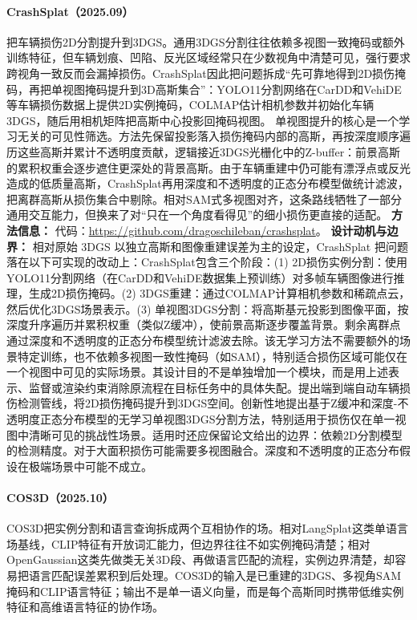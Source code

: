 \paragraph{CrashSplat（2025.09）\cite{2509_23947}}
把车辆损伤2D分割提升到3DGS。通用3DGS分割往往依赖多视图一致掩码或额外训练特征，但车辆划痕、凹陷、反光区域经常只在少数视角中清楚可见，强行要求跨视角一致反而会漏掉损伤。CrashSplat因此把问题拆成“先可靠地得到2D损伤掩码，再把单视图掩码提升到3D高斯集合”：YOLO11分割网络在CarDD和VehiDE等车辆损伤数据上提供2D实例掩码，COLMAP估计相机参数并初始化车辆3DGS，随后用相机矩阵把高斯中心投影回掩码视图。
单视图提升的核心是一个学习无关的可见性筛选。方法先保留投影落入损伤掩码内部的高斯，再按深度顺序遍历这些高斯并累计不透明度贡献，逻辑接近3DGS光栅化中的Z-buffer：前景高斯的累积权重会逐步遮住更深处的背景高斯。由于车辆重建中仍可能有漂浮点或反光造成的低质量高斯，CrashSplat再用深度和不透明度的正态分布模型做统计滤波，把离群高斯从损伤集合中剔除。相对SAM式多视图对齐，这条路线牺牲了一部分通用交互能力，但换来了对“只在一个角度看得见”的细小损伤更直接的适配。
\textbf{方法信息：} 代码：\url{https://github.com/dragoschileban/crashsplat}。
\textbf{设计动机与边界：} 相对原始 3DGS 以独立高斯和图像重建误差为主的设定，CrashSplat 把问题落在以下可实现的改动上：CrashSplat包含三个阶段：(1) 2D损伤实例分割：使用YOLO11分割网络（在CarDD和VehiDE数据集上预训练）对多帧车辆图像进行推理，生成2D损伤掩码。(2) 3DGS重建：通过COLMAP计算相机参数和稀疏点云，然后优化3DGS场景表示。(3) 单视图3DGS分割：将高斯基元投影到图像平面，按深度升序遍历并累积权重（类似Z缓冲），使前景高斯逐步覆盖背景。剩余离群点通过深度和不透明度的正态分布模型统计滤波去除。该无学习方法不需要额外的场景特定训练，也不依赖多视图一致性掩码（如SAM），特别适合损伤区域可能仅在一个视图中可见的实际场景。其设计目的不是单独增加一个模块，而是用上述表示、监督或渲染约束消除原流程在目标任务中的具体失配。提出端到端自动车辆损伤检测管线，将2D损伤掩码提升到3DGS空间。创新性地提出基于Z缓冲和深度-不透明度正态分布模型的无学习单视图3DGS分割方法，特别适用于损伤仅在单一视图中清晰可见的挑战性场景。适用时还应保留论文给出的边界：依赖2D分割模型的检测精度。对于大面积损伤可能需要多视图融合。深度和不透明度的正态分布假设在极端场景中可能不成立。
\paragraph{COS3D（2025.10）\cite{2510_20238}}
COS3D把实例分割和语言查询拆成两个互相协作的场。相对LangSplat这类单语言场基线，CLIP特征有开放词汇能力，但边界往往不如实例掩码清楚；相对OpenGaussian这类先做类无关3D段、再做语言匹配的流程，实例边界清楚，却容易把语言匹配误差累积到后处理。COS3D的输入是已重建的3DGS、多视角SAM掩码和CLIP语言特征；输出不是单一语义向量，而是每个高斯同时携带低维实例特征和高维语言特征的协作场。

